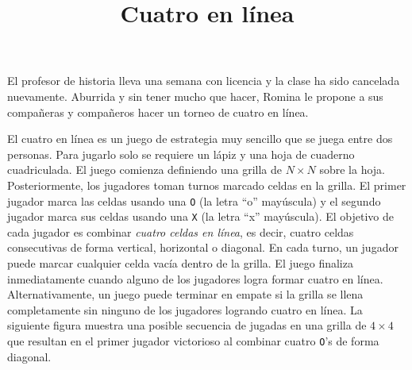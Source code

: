 \documentclass{oci}
\title{Cuatro en línea}
\begin{document}
\begin{problemDescription}
  El profesor de historia lleva una semana con
  licencia y la clase ha sido cancelada nuevamente.
  Aburrida y sin tener mucho que hacer, Romina le
  propone a sus compañeras y compañeros hacer un torneo
  de cuatro en línea.

  El cuatro en línea es un juego de estrategia
  muy sencillo que se juega entre dos personas.
  Para jugarlo solo se requiere un lápiz y una hoja de
  cuaderno cuadriculada.
  El juego comienza definiendo una grilla de
  $N\times N$ sobre la hoja.
  Posteriormente, los jugadores toman turnos
  marcado celdas en la grilla.
  El primer jugador marca las celdas usando una
  \texttt{O} (la letra ``o'' mayúscula)
  y el segundo jugador marca sus celdas usando una
  \texttt{X} (la letra ``x'' mayúscula).
  El objetivo de cada jugador es combinar \emph{cuatro celdas
  en línea}, es decir, cuatro celdas consecutivas de forma
  vertical, horizontal o diagonal.
  En cada turno, un jugador puede marcar cualquier celda vacía
  dentro de la grilla.
  El juego finaliza inmediatamente cuando alguno de los jugadores
  logra formar cuatro en línea.
  Alternativamente, un juego puede terminar en empate si la grilla
  se llena completamente sin ninguno de los jugadores logrando
  cuatro en línea.
  La siguiente figura muestra una posible secuencia de jugadas
  en una grilla de $4\times 4$ que resultan en el primer jugador
  victorioso al combinar cuatro \texttt{O}'s de forma diagonal.
  \begin{center}

\end{center}
\end{problemDescription}
\end{document}
